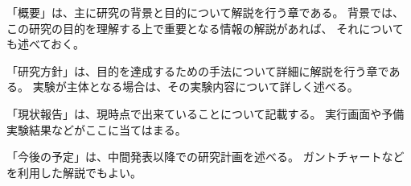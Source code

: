 \documentclass[12pt,a4paper,uplatex,dvipdfmx]{jsarticle}
\begin{document}
「概要」は、主に研究の背景と目的について解説を行う章である。
背景では、この研究の目的を理解する上で重要となる情報の解説があれば、
それについても述べておく。

「研究方針」は、目的を達成するための手法について詳細に解説を行う章である。
実験が主体となる場合は、その実験内容について詳しく述べる。

「現状報告」は、現時点で出来ていることについて記載する。
実行画面や予備実験結果などがここに当てはまる。

「今後の予定」は、中間発表以降での研究計画を述べる。
ガントチャートなどを利用した解説でもよい。



\end{document}
